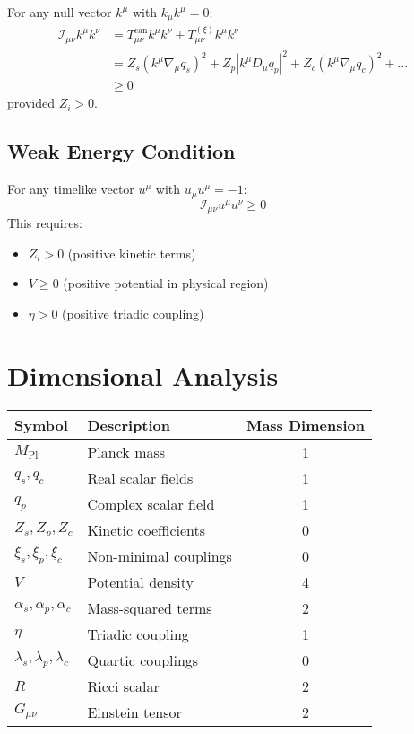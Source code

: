 \documentclass[openany]{memoir}
\theoremstyle{definition}
\theoremstyle{plain}
\theoremstyle{remark}
\newcommand{\MPl}{M_{\text{Pl}}}
\newcommand{\Tcan}{T^{\text{can}}}
\newcommand{\Txi}{T^{(\xi)}}
\begin{document}
For any null vector $k^\mu$ with $k_\mu k^\mu = 0$:
\begin{align}
\mathcal{I}_{\mu\nu} k^\mu k^\nu &= \Tcan_{\mu\nu} k^\mu k^\nu + \Txi_{\mu\nu} k^\mu k^\nu \\
&= Z_s (k^\mu \nabla_\mu q_s)^2 + Z_p |k^\mu D_\mu q_p|^2 + Z_c (k^\mu \nabla_\mu q_c)^2 + \ldots \\
&\geq 0
\end{align}
provided $Z_i > 0$.

\section{Weak Energy Condition}

For any timelike vector $u^\mu$ with $u_\mu u^\mu = -1$:
\begin{equation}
\mathcal{I}_{\mu\nu} u^\mu u^\nu \geq 0
\end{equation}
This requires:
\begin{itemize}
\item $Z_i > 0$ (positive kinetic terms)
\item $V \geq 0$ (positive potential in physical region)
\item $\eta > 0$ (positive triadic coupling)
\end{itemize}

\chapter{Dimensional Analysis}
\label{app:dimensions}

\begin{center}
\begin{tabular}{|l|l|c|}
\hline
\textbf{Symbol} & \textbf{Description} & \textbf{Mass Dimension} \\
\hline
$\MPl$ & Planck mass & 1 \\
$q_s, q_c$ & Real scalar fields & 1 \\
$q_p$ & Complex scalar field & 1 \\
$Z_s, Z_p, Z_c$ & Kinetic coefficients & 0 \\
$\xi_s, \xi_p, \xi_c$ & Non-minimal couplings & 0 \\
$V$ & Potential density & 4 \\
$\alpha_s, \alpha_p, \alpha_c$ & Mass-squared terms & 2 \\
$\eta$ & Triadic coupling & 1 \\
$\lambda_s, \lambda_p, \lambda_c$ & Quartic couplings & 0 \\
$R$ & Ricci scalar & 2 \\
$G_{\mu\nu}$ & Einstein tensor & 2 \\
\hline
\end{tabular}
\end{center}
\end{document}

